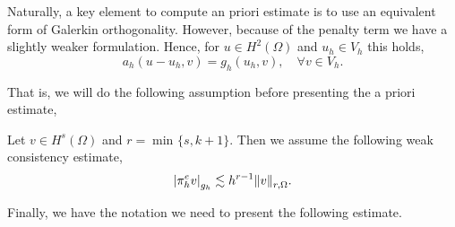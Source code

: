 Naturally, a key element to compute an priori estimate is to use an equivalent form of Galerkin orthogonality. However, because of the penalty term we have a slightly weaker formulation. Hence, for $u \in H^{2}( \Omega ) $ and $u_{h} \in V_{h}$
this holds, \[
a_{h}( u - u_{h}, v) = g_{h}( u_{h},v), \quad  \forall v \in  V_{h}.
\]



That is, we will do the following assumption before presenting the a priori estimate,
\begin{assumption}[EP2]
    \label{as:weak_consistency_estimate}
    Let $v \in H^{s}( \Omega )  $  and $r = \min_{} \{ s, k+1 \}$.  Then we assume the following weak consistency estimate, \[
    \left\lvert  \pi ^{e}_{h} v  \right\rvert _{g_{h}} \lesssim  h^{r-1}\| v \|_{ r,\Omega  }^{  }.
    \]
\end{assumption}

Finally, we have the notation we need to present the following estimate.

